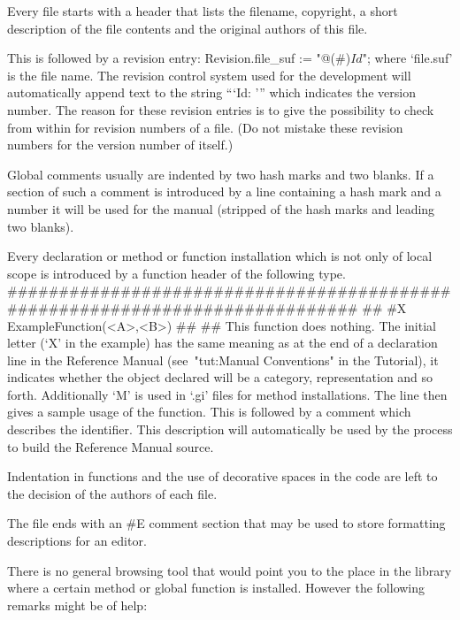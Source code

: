 
Every file starts with a header that lists the filename, copyright, a short
description of the file contents and the original authors of this file.

This is followed by a revision entry:
\begintt
Revision.file_suf :=
    "@(#)$Id$";
\endtt
where `file.suf' is the file name. The revision control system used for the
development will automatically append text to the string ``{`Id: '}'' which
indicates the version number. The reason for these revision entries is to
give the possibility to check from within {\GAP} for revision numbers of a
file. (Do not mistake these revision numbers for the version number of
{\GAP} itself.)

Global comments usually are indented by two hash marks and two blanks.
If a section of such a comment is introduced by a line containing
a hash mark and a number it will be used for the manual
(stripped of the hash marks and leading two blanks).

Every declaration or method or function installation which is not only of
local scope is introduced by a function header of the following type.
\begintt
#############################################################################
##
#X  ExampleFunction(<A>,<B>)
##
##  This function does nothing.
\endtt
The initial letter (`X' in the example) has the same meaning as at the end
of a declaration line in the Reference Manual (see~"tut:Manual Conventions"
in the Tutorial),
it indicates whether the object declared will be a category, representation
and so forth.
Additionally `M' is used in `.gi' files for method installations.
The line then gives a sample usage of the function.
This is followed by a comment which describes the identifier.
This description will automatically be used by the process to build the
Reference Manual source.

Indentation in functions and the use of decorative spaces in the code are
left to the decision of the authors of each file.

The file ends with an 
\begintt
#E
\endtt
comment section that may be used to store formatting descriptions for an
editor.


There is no general browsing tool that would point you to the place in the
library where a certain method or global function is installed. However the
following remarks might be of help:

